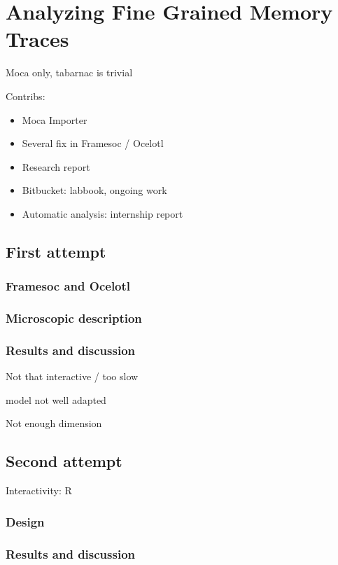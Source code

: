 \chapter{Analyzing Fine Grained Memory Traces}

Moca only, tabarnac is trivial

Contribs:
\begin{itemize}
    \item  Moca Importer
    \item  Several fix in Framesoc / Ocelotl
    \item  Research report
    \item  Bitbucket: labbook, ongoing work
    \item  Automatic analysis: internship report
\end{itemize}


\section{First attempt}

\subsection{Framesoc and Ocelotl}

\subsection{Microscopic description}

\subsection{Results and discussion}

Not that interactive / too slow

model not well adapted

Not enough dimension

\section{Second attempt}

Interactivity: R

\subsection{Design}

\subsection{Results and discussion}

